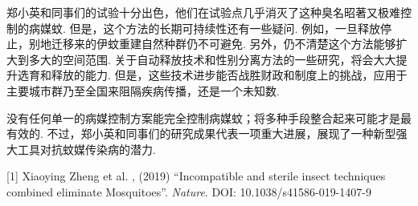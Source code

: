 \begin{multicols}{2}
郑小英和同事们的试验十分出色，他们在试验点几乎消灭了这种臭名昭著又极难控制的病媒蚊. 但是，这个方法的长期可持续性还有一些疑问. 例如，一旦释放停止，别地迁移来的伊蚊重建自然种群仍不可避免. 另外，仍不清楚这个方法能够扩大到多大的空间范围. 关于自动释放技术和性别分离方法的一些研究，将会大大提升选育和释放的能力. 但是，这些技术进步能否战胜财政和制度上的挑战，应用于主要城市群乃至全国来阻隔疾病传播，还是一个未知数. 

没有任何单一的病媒控制方案能完全控制病媒蚊；将多种手段整合起来可能才是最有效的. 不过，郑小英和同事们的研究成果代表一项重大进展，展现了一种新型强大工具对抗蚊媒传染病的潜力. 

\end{multicols}

\noindent{}

\setlength{\parindent}{-3ex}\setlength{\leftskip}{2em}[1] Xiaoying Zheng et al. , (2019) ``Incompatible and sterile insect techniques combined eliminate Mosquitoes''. \textit{Nature}. DOI: 10.1038/s41586-019-1407-9

\vfill

\setlength{\parindent}{2em}\setlength{\leftskip}{0em}

\ADyixuehui
